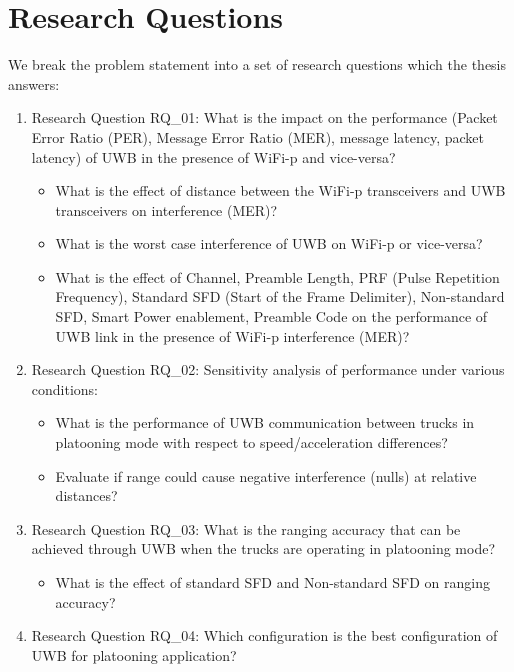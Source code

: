 \section{Research Questions}
We break the problem statement into a set of research questions which the thesis answers:

\begin{enumerate}
	\item Research Question RQ\_01: What is the impact on the performance (Packet Error Ratio (PER), Message Error Ratio (MER), message latency, packet latency) of UWB in the presence of WiFi-p and vice-versa?
	\begin{itemize}
		\item What is the effect of distance between the WiFi-p transceivers and UWB transceivers on interference (MER)?
		\item What is the worst case interference of UWB on WiFi-p or vice-versa?
		\item What is the effect of Channel, Preamble Length, PRF (Pulse Repetition Frequency), Standard SFD (Start of the Frame Delimiter), Non-standard SFD, Smart Power enablement, Preamble Code on the performance of UWB link in the presence of WiFi-p interference (MER)?
	\end{itemize}
	
	\item Research Question RQ\_02: Sensitivity analysis of performance under various conditions:
	\begin{itemize}
		\item What is the performance of UWB communication between trucks in platooning mode with respect to speed/acceleration differences?
		\item Evaluate if range could cause negative interference (nulls) at relative distances?
	\end{itemize}
	\item Research Question RQ\_03: What is the ranging accuracy that can be achieved through UWB when the trucks are operating in platooning mode?
	\begin{itemize}
		\item What is the effect of standard SFD and Non-standard SFD on ranging accuracy?
	\end{itemize}
	
	\item Research Question RQ\_04: Which configuration is the best configuration of UWB for platooning application?
	
\end{enumerate}

